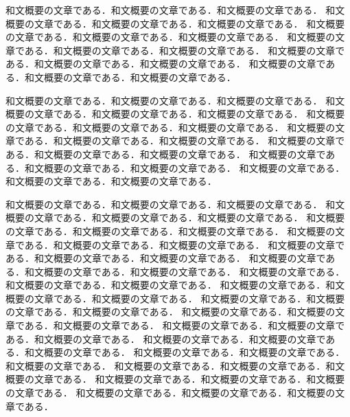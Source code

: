 和文概要の文章である．和文概要の文章である．和文概要の文章である．
和文概要の文章である．和文概要の文章である．和文概要の文章である．
和文概要の文章である．和文概要の文章である．和文概要の文章である．
和文概要の文章である．和文概要の文章である．和文概要の文章である．
和文概要の文章である．和文概要の文章である．和文概要の文章である．
和文概要の文章である．和文概要の文章である．和文概要の文章である．

和文概要の文章である．和文概要の文章である．和文概要の文章である．
和文概要の文章である．和文概要の文章である．和文概要の文章である．
和文概要の文章である．和文概要の文章である．和文概要の文章である．
和文概要の文章である．和文概要の文章である．和文概要の文章である．
和文概要の文章である．和文概要の文章である．和文概要の文章である．
和文概要の文章である．和文概要の文章である．和文概要の文章である．
和文概要の文章である．和文概要の文章である．和文概要の文章である．


和文概要の文章である．和文概要の文章である．和文概要の文章である．
和文概要の文章である．和文概要の文章である．和文概要の文章である．
和文概要の文章である．和文概要の文章である．和文概要の文章である．
和文概要の文章である．和文概要の文章である．和文概要の文章である．
和文概要の文章である．和文概要の文章である．和文概要の文章である．
和文概要の文章である．和文概要の文章である．和文概要の文章である．
和文概要の文章である．和文概要の文章である．和文概要の文章である．
和文概要の文章である．和文概要の文章である．和文概要の文章である．
和文概要の文章である．和文概要の文章である．和文概要の文章である．
和文概要の文章である．和文概要の文章である．和文概要の文章である．
和文概要の文章である．和文概要の文章である．和文概要の文章である．
和文概要の文章である．和文概要の文章である．和文概要の文章である．
和文概要の文章である．和文概要の文章である．和文概要の文章である．
和文概要の文章である．和文概要の文章である．和文概要の文章である．
和文概要の文章である．和文概要の文章である．和文概要の文章である．
和文概要の文章である．和文概要の文章である．和文概要の文章である．

